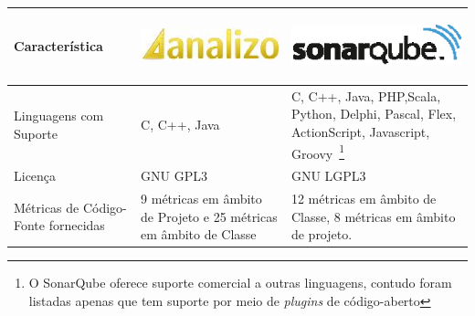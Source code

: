 \begin{savenotes}
\begin{table}[!ht]
\centering
\begin{tabular}{|p{5cm}|p{4.5cm}|p{5cm}|}
\hline

Característica 

&

\begin{center}
\includegraphics[keepaspectratio=true,scale=0.48]{figuras/analizo.eps} 
\end{center}


&



\begin{center}
\includegraphics[keepaspectratio=true,scale=0.48]{figuras/sonarqube.eps} 
\end{center}





   
\\ \hline


Linguagens com Suporte  & C, C++, Java & C, C++, Java, PHP,Scala, Python, Delphi, Pascal, Flex, ActionScript, Javascript, Groovy~\footnote{O SonarQube oferece suporte comercial a outras linguagens, contudo foram listadas apenas que tem suporte por meio de \textit{plugins} de código-aberto} \\ \hline
Licença  & GNU GPL3 & GNU LGPL3  \\ \hline




Métricas de Código-Fonte fornecidas  & 9 métricas em âmbito de Projeto e 25  métricas em âmbito de Classe \cite{Meirelles2013} & 12 métricas em âmbito de Classe, 8 métricas em âmbito de projeto. \\ \hline



\end{tabular}
\end{table}
\end{savenotes}

